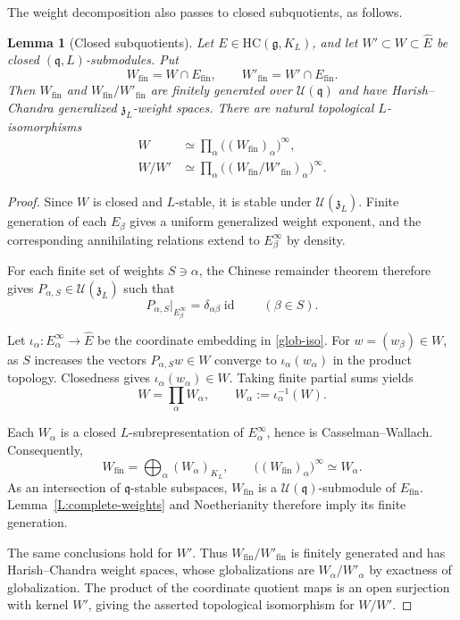 \documentclass[a4paper,12pt]{amsart}
\numberwithin{equation}{section}
\theoremstyle{plain}
\newtheorem{lemma}[theorem]{Lemma}
\theoremstyle{definition}
\theoremstyle{remark}
\newcommand{\HC}{\mathrm{HC}}
\begin{document}
The weight decomposition also passes to closed subquotients, as follows.

\begin{lemma}[Closed subquotients]\label{L:closed-weight-subquotients}
Let $E\in\HC(\mathfrak g,K_L)$, and let $W'\subset W\subset\widehat E$ be closed $(\mathfrak q,L)$-submodules.
Put
\[
 W_{\mathrm{fin}}=W\cap E_{\mathrm{fin}},
 \qquad
 W'_{\mathrm{fin}}=W'\cap E_{\mathrm{fin}}.
\]
Then $W_{\mathrm{fin}}$ and $W_{\mathrm{fin}}/W'_{\mathrm{fin}}$ are finitely generated over $\mathcal U(\mathfrak q)$ and have Harish--Chandra generalized $\mathfrak z_L$-weight spaces.
There are natural topological $L$-isomorphisms
\[
 \begin{aligned}
 W&\simeq\prod_\alpha\bigl((W_{\mathrm{fin}})_\alpha\bigr)^\infty,\\
 W/W'&\simeq\prod_\alpha
       \bigl((W_{\mathrm{fin}}/W'_{\mathrm{fin}})_\alpha\bigr)^\infty.
 \end{aligned}
\]
\end{lemma}
\begin{proof}
Since $W$ is closed and $L$-stable, it is stable under $\mathcal U(\mathfrak z_L)$.
Finite generation of each $E_\beta$ gives a uniform generalized weight exponent, and the corresponding annihilating relations extend to $E_\beta^\infty$ by density.

For each finite set of weights $S\ni\alpha$, the Chinese remainder theorem therefore gives $P_{\alpha,S}\in\mathcal U(\mathfrak z_L)$ such that
\[
 P_{\alpha,S}|_{E_\beta^\infty}
 =\delta_{\alpha\beta}\operatorname{id}
 \qquad(\beta\in S).
\]

Let $\iota_\alpha:E_\alpha^\infty\to\widehat E$ be the coordinate embedding in \eqref{glob-iso}.
For $w=(w_\beta)\in W$, as $S$ increases the vectors $P_{\alpha,S}w\in W$ converge to $\iota_\alpha(w_\alpha)$ in the product topology.
Closedness gives $\iota_\alpha(w_\alpha)\in W$.
Taking finite partial sums yields
\[
 W=\prod_\alpha W_\alpha,
 \qquad W_\alpha:=\iota_\alpha^{-1}(W).
\]

Each $W_\alpha$ is a closed $L$-subrepresentation of $E_\alpha^\infty$, hence is Casselman--Wallach.
Consequently,
\[
 W_{\mathrm{fin}}=\bigoplus_\alpha(W_\alpha)_{K_L},
 \qquad
 \bigl((W_{\mathrm{fin}})_\alpha\bigr)^\infty\simeq W_\alpha.
\]
As an intersection of $\mathfrak q$-stable subspaces, $W_{\mathrm{fin}}$ is a $\mathcal U(\mathfrak q)$-submodule of $E_{\mathrm{fin}}$.
Lemma~\ref{L:complete-weights} and Noetherianity therefore imply its finite generation.

The same conclusions hold for $W'$.
Thus $W_{\mathrm{fin}}/W'_{\mathrm{fin}}$ is finitely generated and has Harish--Chandra weight spaces, whose globalizations are $W_\alpha/W'_\alpha$ by exactness of globalization.
The product of the coordinate quotient maps is an open surjection with kernel $W'$, giving the asserted topological isomorphism for $W/W'$.
\end{proof}
\end{document}
